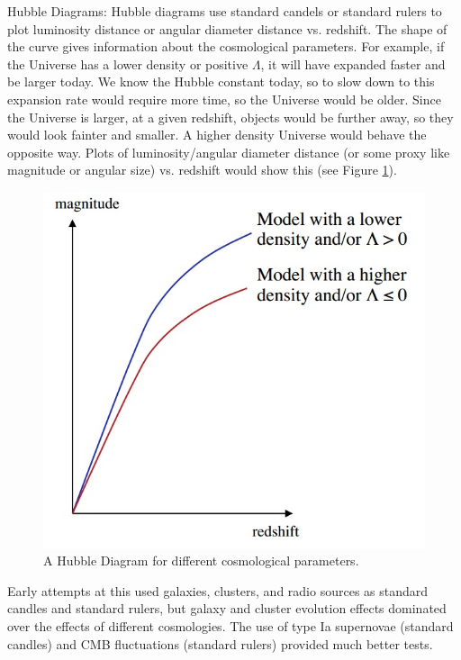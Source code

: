 Hubble Diagrams:\newline
Hubble diagrams use standard candels or standard rulers to plot luminosity 
distance or angular diameter distance vs. redshift.  The shape of the 
curve gives information about the cosmological parameters.  For example, 
if the Universe has a lower density or positive $\Lambda$, it will have 
expanded faster and be larger today.  We know the Hubble constant today, 
so to slow down to this expansion rate would require more time, so the 
Universe would be older.  Since the Universe is larger, at a given 
redshift, objects would be further away, so they would look fainter and 
smaller.  A higher density Universe would behave the opposite way.  Plots 
of luminosity/angular diameter distance (or some proxy like magnitude or 
angular size) vs. redshift would show this (see Figure \ref{fig:hubble}).

\begin{figure}[!h]
\begin{center}
\includegraphics[width=\textwidth]{hubble.jpg}
\end{center}
\caption{A Hubble Diagram for different cosmological parameters.
\label{fig:hubble}}
\end{figure}

Early attempts at this used galaxies, clusters, and radio sources as standard 
candles and standard rulers, but galaxy and cluster evolution effects 
dominated over the effects of different cosmologies.  The use of type Ia 
supernovae (standard candles) and CMB fluctuations (standard rulers) provided 
much better tests.  

